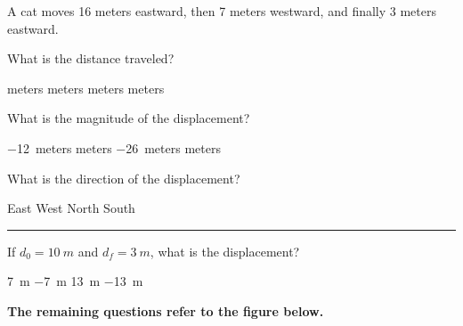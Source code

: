 \documentclass[answers]{exam}
\begin{document}
\begin{questions}
\begin{questions}
\begin{EnvUplevel}
A cat moves 16 meters eastward, then 7 meters westward, and finally 3 meters eastward. 
\end{EnvUplevel}



\question \label{ques:cat_start}
What is the distance traveled?

\begin{choices}
 meters
 meters
 meters
 meters
\end{choices}

\question
What is the magnitude of the displacement?

\begin{choices}
\choice \SI{-12}{meters}
 meters
\choice \SI{-26}{meters}
 meters
\end{choices}

\question \label{ques:cat_end}
What is the direction of the displacement?

\begin{choices}
\CorrectChoice East
\choice West
\choice North
\choice South
\end{choices}

\vspace{1em} \hrule

\question
If $d_0 = \SI{10}{m}$ and $d_f = \SI{3}{m}$, what is the displacement?

\begin{choices}
\choice \SI{7}{m}
\CorrectChoice \SI{-7}{m} 
\choice \SI{13}{m}
\choice \SI{-13}{m}
\end{choices}

\clearpage
\begin{EnvUplevel}
\textbf{The remaining questions refer to the figure below.}
\end{EnvUplevel}



\end{questions}
\end{questions}
\end{document}
